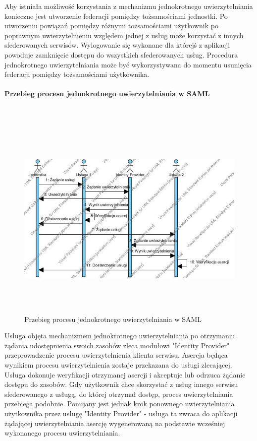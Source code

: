 			Aby istniała możliwość korzystania z mechanizmu jednokrotnego uwierzytelniania konieczne jest utworzenie federacji pomiędzy tożsamościami jednostki. Po utworzeniu powiązań pomiędzy różnymi tożsamościami użytkownik po poprawnym uwierzytelnieniu względem jednej z usług może korzystać z innych sfederowanych serwisów. Wylogowanie się wykonane dla którejś z aplikacji powoduje zamknięcie dostępu do wszystkich sfederowanych usług. Procedura jednokrotnego uwierzytelniania może być wykorzystywana do momentu usunięcia federacji pomiędzy tożsamościami użytkownika.

		\paragraph{Przebieg procesu jednokrotnego uwierzytelniania w SAML}\mbox{}\\

			\begin{figure}[h]
				\centering
					\includegraphics[width=15cm,height=10cm]{img/ssoSteps.jpg}
				\caption{Przebieg procesu jednokrotnego uwierzytelniania w SAML}
				\label{Przebieg procesu jednokrotnego uwierzytelniania w SAML}
			\end{figure}

			Usługa objęta mechanizmem jednokrotnego uwierzytelniania po otrzymaniu żądania udostępnienia swoich zasobów zleca modułowi "Identity Provider" przeprowadzenie procesu uwierzytelnienia klienta serwisu. Asercja będąca wynikiem procesu uwierzytelnienia zostaje przekazana do usługi zlecającej. Usługa dokonuje weryfikacji otrzymanej asercji i akceptuje lub odrzuca żądanie dostępu do zasobów. Gdy użytkownik chce skorzystać z usług innego serwisu sfederowanego z usługą, do której otrzymał dostęp, proces uwierzytelniania przebiega podobnie. Pomijany jest jednak krok ponownego uwierzytelniania użytkownika przez usługę "Identity Provider" - usługa ta zwraca do aplikacji żądającej uwierzytelniania asercję wygenerowaną na podstawie wcześniej wykonanego procesu uwierzytelniania.	

